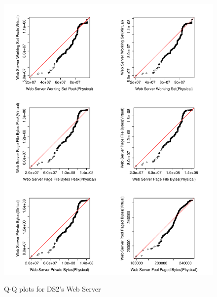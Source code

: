 \begin{figure}[tbh]
	\centering
	{\includegraphics[width=1.0\textwidth]{figures/appendix/qq_plots/DS2/Web_Server/Second_six.pdf}}
	\caption{Q-Q plots for DS2's Web Server}
\end{figure}

